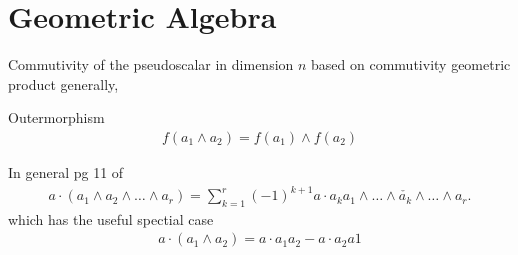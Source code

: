 




\section{Geometric Algebra}



Commutivity of the pseudoscalar in dimension $n$
based on commutivity geometric product generally,



Outermorphism
\begin{align}
 f(a_1 \wedge a_2) = f(a_1)\wedge f(a_2) \label{eqn:outermorphism}
\end{align}

In general pg 11 of \cite{Hestenes1984}
\begin{align}
 a \cdot \left(  a_1\wedge a_2\wedge \ldots \wedge a_r  \right) =
 \sum_{k=1}^r (-1)^{k+1} a\cdot a_k a_1 \wedge \ldots \wedge \check{a_k}
 \wedge \ldots \wedge a_r.
\end{align}
which has the useful spectial case
\begin{align}
 a\cdot (a_1 \wedge a_2) = a \cdot a_1 a_2 - a\cdot a_2 a1
 \label{eqn:dot_wedge}
\end{align}

